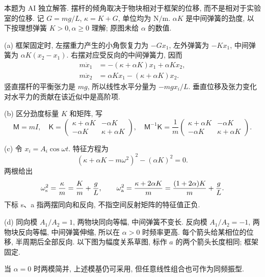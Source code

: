 \begin{solution}
本题为 AI 独立解答. 摆杆的倾角取决于物块相对于框架的位移, 而不是相对于实验室的位移. 记 $G=mg/L$, $\kappa=K+G$, 单位均为 $\mathrm{N/m}$. $\alpha K$ 是中间弹簧的劲度, 以下按理想弹簧 $K>0,\alpha\ge0$ 理解; 原图未给 $\alpha$ 的数值.

(a) 框架固定时, 左摆重力产生的小角恢复力为 $-Gx_1$, 左外弹簧为 $-Kx_1$, 中间弹簧为 $\alpha K(x_2-x_1)$. 右摆对应受反向的中间弹簧力, 因而
\begin{align*}
m\ddot x_1&=-(\kappa+\alpha K)x_1+\alpha Kx_2,\\
m\ddot x_2&=\alpha Kx_1-(\kappa+\alpha K)x_2.
\end{align*}
竖直摆杆的平衡张力是 $mg$, 所以线性水平分量为 $-mgx_i/L$. 垂直位移及张力变化对水平力的贡献在该近似中是高阶项.

(b) 区分劲度标量 $K$ 和矩阵, 写
\[
\mathsf M=mI,\quad
\mathsf K=\begin{pmatrix}\kappa+\alpha K&-\alpha K\\-\alpha K&\kappa+\alpha K\end{pmatrix},\quad
\mathsf M^{-1}\mathsf K=\frac1m\begin{pmatrix}\kappa+\alpha K&-\alpha K\\-\alpha K&\kappa+\alpha K\end{pmatrix}.
\]

(c) 令 $x_i=A_i\cos\omega t$. 特征方程为
\[
(\kappa+\alpha K-m\omega^2)^2-(\alpha K)^2=0.
\]
两根给出
\[
\omega_{\rm s}^2=\frac\kappa m=\frac Km+\frac gL,\qquad
\omega_{\rm a}^2=\frac{\kappa+2\alpha K}{m}=\frac{(1+2\alpha)K}{m}+\frac gL.
\]
下标 s、a 指两摆同向和反向, 不指空间反射矩阵的特征值正负.

(d) 同向模 $A_1/A_2=1$, 两物块同向等幅, 中间弹簧不变长. 反向模 $A_1/A_2=-1$, 两物块反向等幅, 中间弹簧伸缩, 所以在 $\alpha>0$ 时频率更高. 每个箭头给某相位的位移, 半周期后全部反向. 以下图为幅度关系草图, 标作 $a$ 的两个箭头长度相同; 框架固定.
\begin{center}
\end{center}
当 $\alpha=0$ 时两模简并, 上述模基仍可采用, 但任意线性组合也可作为同频振型.


\end{solution}
